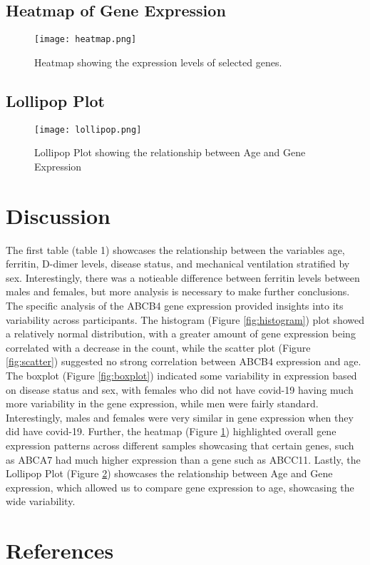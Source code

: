 \documentclass{article}
\begin{document}
\subsection{Heatmap of Gene Expression}
\begin{figure}[H]
\centering
\texttt{[image: heatmap.png]}
\caption{Heatmap showing the expression levels of selected genes.}
\label{fig:heatmap}
\end{figure}

\subsection{Lollipop Plot}
\begin{figure}[H]
\centering
\texttt{[image: lollipop.png]}
\caption{Lollipop Plot showing the relationship between Age and Gene Expression}
\label{fig:lollipop}
\end{figure}

\section{Discussion}
The first table (table 1) showcases the relationship between the variables age, ferritin, D-dimer levels, disease status, and mechanical ventilation stratified by sex. Interestingly, there was a notieable difference between ferritin levels between males and females, but more analysis is necessary to make further conclusions. The specific analysis of the ABCB4 gene expression provided insights into its variability across participants. The histogram (Figure \ref{fig:histogram}) plot showed a relatively normal distribution, with a greater amount of gene expression being correlated with a decrease in the count, while the scatter plot (Figure \ref{fig:scatter}) suggested no strong correlation between ABCB4 expression and age. The boxplot (Figure \ref{fig:boxplot}) indicated some variability in expression based on disease status and sex, with females who did not have covid-19 having much more variability in the gene expression, while men were fairly standard. Interestingly, males and females were very similar in gene expression when they did have covid-19. Further, the heatmap (Figure \ref{fig:heatmap}) highlighted overall gene expression patterns across different samples showcasing that certain genes, such as ABCA7 had much higher expression than a gene such as ABCC11. Lastly, the Lollipop Plot (Figure \ref{fig:lollipop}) showcases the relationship between Age and Gene expression, which allowed us to compare gene expression to age, showcasing the wide variability.

\newpage
\section{References}

 
\end{document}

